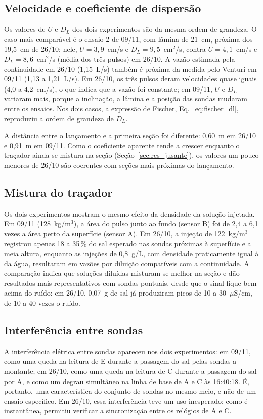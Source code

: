 \documentclass[12pt,a4paper]{article}
\providecommand{\uScm}{\ensuremath{\mu}S/cm}
\begin{document}
\subsection{Velocidade e coeficiente de dispersão}
Os valores de $U$ e $D_L$ dos dois experimentos são da mesma ordem de grandeza. O caso mais comparável é o ensaio 2 de 09/11, com lâmina de 21~cm, próxima dos 19,5~cm de 26/10: nele, $U = 3{,}9$~cm/s e $D_L = 9{,}5$~cm$^2$/s, contra $U = 4{,}1$~cm/s e $D_L = 8{,}6$~cm$^2$/s (média dos três pulsos) em 26/10. A vazão estimada pela continuidade em 26/10 (1,15~L/s) também é próxima da medida pelo Venturi em 09/11 (1,13 a 1,21~L/s). Em 26/10, os três pulsos deram velocidades quase iguais (4,0 a 4,2~cm/s), o que indica que a vazão foi constante; em 09/11, $U$ e $D_L$ variaram mais, porque a inclinação, a lâmina e a posição das sondas mudaram entre os ensaios. Nos dois casos, a expressão de Fischer, Eq.~\eqref{eq:fischer_dl}, reproduziu a ordem de grandeza de $D_L$.

A distância entre o lançamento e a primeira seção foi diferente: 0,60~m em 26/10 e 0,91~m em 09/11. Como o coeficiente aparente tende a crescer enquanto o traçador ainda se mistura na seção (Seção~\ref{sec:res_jusante}), os valores um pouco menores de 26/10 são coerentes com seções mais próximas do lançamento.

\subsection{Mistura do traçador}
Os dois experimentos mostram o mesmo efeito da densidade da solução injetada. Em 09/11 (128~kg/m$^3$), a área do pulso junto ao fundo (sensor B) foi de 2,4 a 6,1 vezes a área perto da superfície (sensor A). Em 26/10, a injeção de 122~kg/m$^3$ registrou apenas 18 a 35\,\% do sal esperado nas sondas próximas à superfície e a meia altura, enquanto as injeções de 0,8~g/L, com densidade praticamente igual à da água, resultaram em vazões por diluição compatíveis com a continuidade. A comparação indica que soluções diluídas misturam-se melhor na seção e dão resultados mais representativos com sondas pontuais, desde que o sinal fique bem acima do ruído: em 26/10, 0,07~g de sal já produziram picos de 10 a 30~\uScm, de 10 a 40 vezes o ruído.

\subsection{Interferência entre sondas}
A interferência elétrica entre sondas apareceu nos dois experimentos: em 09/11, como uma queda na leitura de E durante a passagem do sal pelas sondas a montante; em 26/10, como uma queda na leitura de C durante a passagem do sal por A, e como um degrau simultâneo na linha de base de A e C às 16:40:18. É, portanto, uma característica do conjunto de sondas no mesmo meio, e não de um ensaio específico. Em 26/10, essa interferência teve um uso inesperado: como é instantânea, permitiu verificar a sincronização entre os relógios de A e C.
\end{document}
